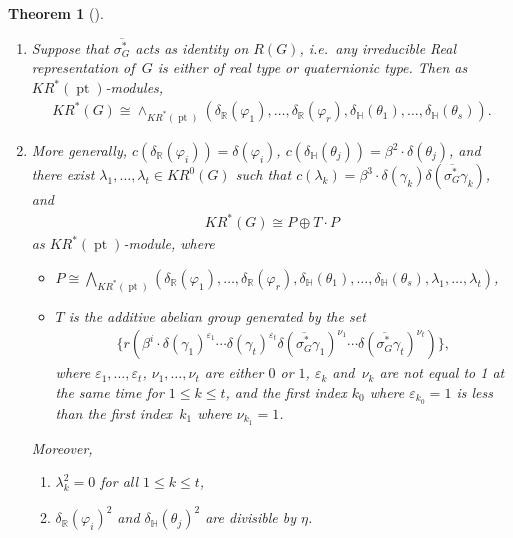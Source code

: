 \documentclass[pdftex]{sigma}
\numberwithin{equation}{section}
\newtheorem{Theorem}{Theorem}[section]
\DeclareMathOperator{\pt}{pt}
\begin{document}
\begin{Theorem}[{\cite[Theorem 5.6]{Se}}]
\label{krtheorymodofg}\quad
\begin{enumerate}\itemsep=0pt
\item[$1.$]
Suppose that $\overline{\sigma_G^*}$ acts as identity on $R(G)$, i.e.\
any irreducible Real representation of~$G$ is either of real type or quaternionic type.
Then as $KR^*(\pt)$-modules,
\begin{gather*}
KR^*(G)\cong\wedge_{KR^*(\pt)}(\delta_\mathbb{R}(\varphi_1), \dots, \delta_\mathbb{R}(\varphi_r),
\delta_\mathbb{H}(\theta_1), \dots, \delta_\mathbb{H}(\theta_s)).
\end{gather*}
\item[$2.$]
More generally, $c(\delta_\mathbb{R}(\varphi_i))=\delta(\varphi_i)$,
$c(\delta_\mathbb{H}(\theta_j))=\beta^2\cdot\delta(\theta_j)$, and there exist $\lambda_1, \dots, \lambda_t\in KR^0(G)$
such that $c(\lambda_k)=\beta^3\cdot\delta(\gamma_k)\delta(\overline{\sigma_G^*}
\gamma_k)$, and
\begin{gather*}
KR^*(G)\cong P\oplus T\cdot P
\end{gather*}
as $KR^*(\pt)$-module, where
\begin{itemize}\itemsep=0pt
\item
$P\cong\bigwedge_{KR^*(\pt)}(\delta_\mathbb{R}(\varphi_1), \dots, \delta_\mathbb{R}(\varphi_r),
\delta_\mathbb{H}(\theta_1), \dots, \delta_\mathbb{H}(\theta_s), \lambda_1, \dots, \lambda_t)$,
\item
$T$ is the additive abelian group generated by the set
\begin{gather*}
\{r(\beta^i\cdot\delta(\gamma_1)^{\varepsilon_1}\cdots\delta(\gamma_t)^{\varepsilon_t}\delta(\overline{\sigma_G^*}
\gamma_1)^{\nu_1}\cdots\delta(\overline{\sigma_G^*}\gamma_t)^{\nu_t})\},
\end{gather*}
where $\varepsilon_1, \dots, \varepsilon_t$, $\nu_1, \dots, \nu_t$ are either $0$ or $1$, $\varepsilon_k$ and~$\nu_k$ are not
equal to 1 at the same time for $1\leq k\leq t$, and the first index $k_0$ where $\varepsilon_{k_0}=1$ is less than the
first index~$k_1$ where $\nu_{k_1}=1$.
\end{itemize}
Moreover,
\begin{enumerate}\itemsep=0pt
\item[$(a)$]
$\lambda_k^2=0$ for all $1\leq k\leq t$,
\item[$(b)$]
$\delta_\mathbb{R}(\varphi_i)^2$ and $\delta_\mathbb{H}(\theta_j)^2$ are divisible by $\eta$.
\end{enumerate}
\end{enumerate}
\end{Theorem}
\end{document}
